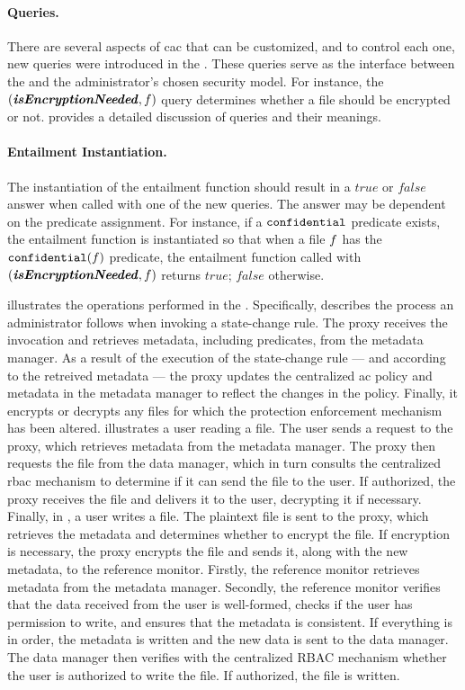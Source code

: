 \paragraph{Queries.} There are several aspects of \gls{cac} that can be customized, and to control each one, new queries were introduced in the \erbac. These queries serve as the interface between the \erbac and the administrator's chosen security model. For instance, the \( ( \textbf{\textit{isEncryptionNeeded}}, f ) \) query determines whether a file should be encrypted or not.  provides a detailed discussion of queries and their meanings. 


\paragraph{Entailment Instantiation.} The instantiation of the entailment function should result in a \( \mathit{true} \) or \( \mathit{false} \) answer when called with one of the new queries. The answer may be dependent on the predicate assignment. For instance, if a \( \mathtt{confidential} \) predicate exists, the entailment function is instantiated so that when a file \( f \) has the \( \mathtt{confidential}(f) \) predicate, the entailment function called with \( ( \textbf{\textit{isEncryptionNeeded}}, f ) \) returns \( \mathit{true} \); \( \mathit{false} \) otherwise.

 illustrates the operations performed in the \hybrid. Specifically,  describes the process an administrator follows when invoking a state-change rule. The proxy receives the invocation and retrieves metadata, including predicates, from the metadata manager. As a result of the execution of the state-change rule --- and according to the retreived metadata --- the proxy updates the centralized \gls{ac} policy and metadata in the metadata manager to reflect the changes in the policy. Finally, it encrypts or decrypts any files for which the protection enforcement mechanism has been altered.  illustrates a user reading a file. The user sends a request to the proxy, which retrieves metadata from the metadata manager. The proxy then requests the file from the data manager, which in turn consults the centralized \gls{rbac} mechanism to determine if it can send the file to the user. If authorized, the proxy receives the file and delivers it to the user, decrypting it if necessary. Finally, in , a user writes a file. The plaintext file is sent to the proxy, which retrieves the metadata and determines whether to encrypt the file. If encryption is necessary, the proxy encrypts the file and sends it, along with the new metadata, to the reference monitor. Firstly, the reference monitor retrieves metadata from the metadata manager. Secondly, the reference monitor verifies that the data received from the user is well-formed, checks if the user has permission to write, and ensures that the metadata is consistent. If everything is in order, the metadata is written and the new data is sent to the data manager. The data manager then verifies with the centralized RBAC mechanism whether the user is authorized to write the file. If authorized, the file is written.

